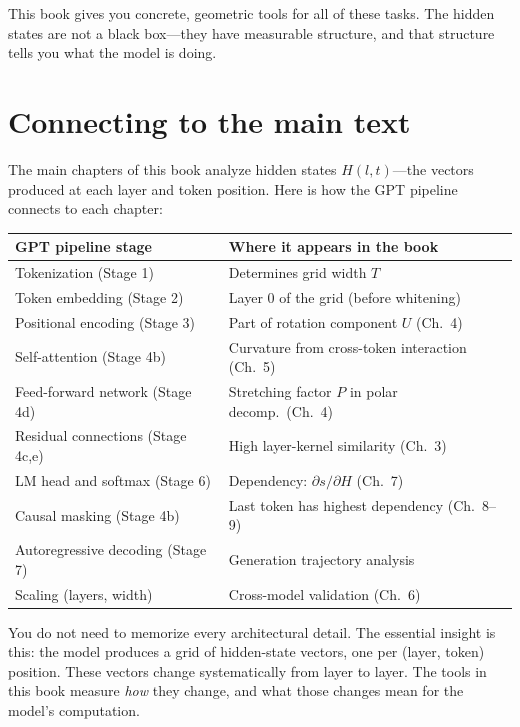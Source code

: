\documentclass[11pt, twoside, openright]{memoir}
\begin{document}
\begin{keyidea}
This book gives you concrete, geometric tools for all of these tasks.  The
hidden states are not a black box---they have measurable structure, and that
structure tells you what the model is doing.
\end{keyidea}

\section{Connecting to the main text}

The main chapters of this book analyze hidden states $H(l,t)$---the
vectors produced at each layer and token position.  Here is how the GPT
pipeline connects to each chapter:

\begin{center}\small
\begin{tabular}{@{}ll@{}}
\toprule
\textbf{GPT pipeline stage} & \textbf{Where it appears in the book} \\
\midrule
Tokenization (Stage 1)              & Determines grid width $T$ \\
Token embedding (Stage 2)           & Layer 0 of the grid (before whitening) \\
Positional encoding (Stage 3)       & Part of rotation component $U$ (Ch.~4) \\
Self-attention (Stage 4b)           & Curvature from cross-token interaction (Ch.~5) \\
Feed-forward network (Stage 4d)     & Stretching factor $P$ in polar decomp.\ (Ch.~4) \\
Residual connections (Stage 4c,e)   & High layer-kernel similarity (Ch.~3) \\
LM head and softmax (Stage 6)      & Dependency: $\partial s / \partial H$ (Ch.~7) \\
Causal masking (Stage 4b)          & Last token has highest dependency (Ch.~8--9) \\
Autoregressive decoding (Stage 7)   & Generation trajectory analysis \\
Scaling (layers, width)             & Cross-model validation (Ch.~6) \\
\bottomrule
\end{tabular}
\end{center}

You do not need to memorize every architectural detail.  The essential
insight is this: the model produces a grid of hidden-state vectors, one per
(layer, token) position.  These vectors change systematically from layer to
layer.  The tools in this book measure \emph{how} they change, and what
those changes mean for the model's computation.
\end{document}
